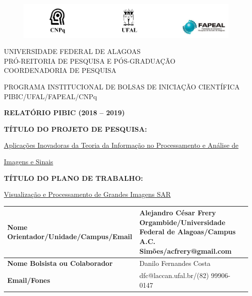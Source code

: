 \documentclass[12pt]{article}
\begin{document}
\thispagestyle{empty}
\begin{center}
\vspace{0.2cm}

\begin{figure}
    \centering
    \includegraphics[width = \linewidth]{header.png}
\end{figure}
\vspace{-1cm}
\hrulefill

UNIVERSIDADE FEDERAL DE ALAGOAS\\
PRÓ-REITORIA DE PESQUISA E PÓS-GRADUAÇÃO\\
COORDENADORIA DE PESQUISA

\hrulefill

\vspace{0.5cm}

PROGRAMA INSTITUCIONAL DE BOLSAS DE INICIAÇÃO CIENTÍFICA\\PIBIC/UFAL/FAPEAL/CNPq

\vspace{1.0cm}

\textbf{RELATÓRIO PIBIC (2018 -- 2019)}\\

\end{center}

\vspace{1.2cm}

\textbf{TÍTULO DO PROJETO DE PESQUISA:}

\underline{Aplicações Inovadoras da Teoria da Informação no Processamento e Análise de}

\underline{Imagens e Sinais}

\textbf{TÍTULO DO PLANO DE TRABALHO:}

\underline{Visualização e Processamento de Grandes Imagens SAR}

\vspace{1cm}

\begin{table}[!h]
\begin{center}
\begin{tabularx}{\textwidth}{|X|X|X|}
\hline                              
\textbf{Nome Orientador/Unidade/Campus/Email} &  Alejandro César Frery Orgambide/Universidade Federal de Alagoas/Campus A.C. Simões/acfrery@gmail.com\\
\hline     
\textbf{Nome Bolsista ou Colaborador} & Danilo Fernandes Costa\\
\hline     
\textbf{Email/Fones} & dfc@laccan.ufal.br/(82) 99906-0147\\
\hline     
\end{tabularx}
\end{center}
\end{table}
\end{document}
